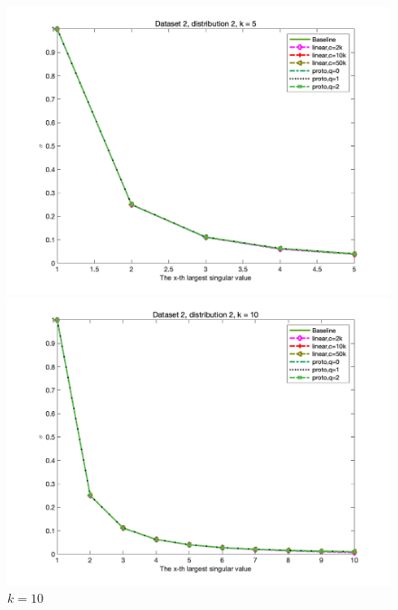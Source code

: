 \documentclass{article}
\begin{document}
\begin{figure}[p]
	\begin{minipage}{0.54\linewidth}
		\centering
		\includegraphics[width=1\linewidth]{./fig/dataset2_k5_t2.png}
		\caption{$k=5$}
	\end{minipage}
	\begin{minipage}{0.54\linewidth}
		\centering
		\includegraphics[width=1\linewidth]{./fig/dataset2_k10_t2.png}
		\caption{$k=10$}
	\end{minipage}
    \begin{minipage}{0.54\linewidth}
		\centering

\end{minipage}
\end{figure}
\end{document}
